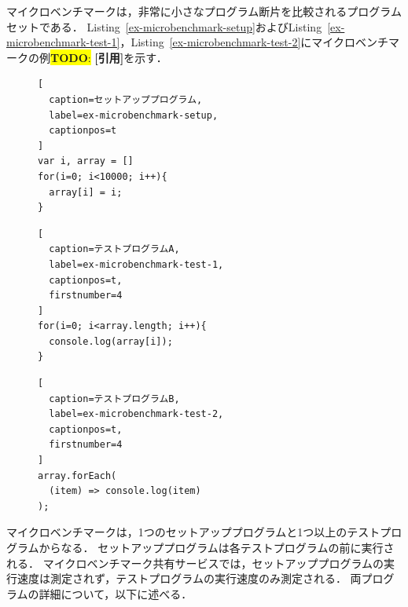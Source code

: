 \documentclass[11pt]{jreport}
\newcommand{\todo}[1]{\colorbox{yellow}{{\bf TODO}:}{\color{red} {\textbf{[#1]}}}}
\begin{document}
マイクロベンチマークは，非常に小さなプログラム断片を比較されるプログラムセットである．
Listing~\ref{ex-microbenchmark-setup}およびListing~\ref{ex-microbenchmark-test-1}，Listing~\ref{ex-microbenchmark-test-2}にマイクロベンチマークの例\todo{引用}を示す．

\begin{figure}[t]
\captionsetup{name=Listing}
\hspace{0.04\columnwidth}
\begin{minipage}[b]{0.96\linewidth}
\begin{lstlisting}[
  caption=セットアッププログラム,
  label=ex-microbenchmark-setup,
  captionpos=t
]
var i, array = []
for(i=0; i<10000; i++){
  array[i] = i;
}
\end{lstlisting}
\end{minipage}

\hspace{0.04\columnwidth}
\begin{minipage}[b]{0.445\linewidth}
\begin{lstlisting}[
  caption=テストプログラムA,
  label=ex-microbenchmark-test-1,
  captionpos=t,
  firstnumber=4
]
for(i=0; i<array.length; i++){
  console.log(array[i]);
}
\end{lstlisting}
\end{minipage}
\hspace{0.059\columnwidth}
\begin{minipage}[b]{0.445\linewidth}
\begin{lstlisting}[
  caption=テストプログラムB,
  label=ex-microbenchmark-test-2,
  captionpos=t,
  firstnumber=4
]
array.forEach(
  (item) => console.log(item)
);
\end{lstlisting}
\end{minipage}
\end{figure}


マイクロベンチマークは，1つのセットアッププログラムと1つ以上のテストプログラムからなる．
セットアッププログラムは各テストプログラムの前に実行される．
マイクロベンチマーク共有サービスでは，セットアッププログラムの実行速度は測定されず，テストプログラムの実行速度のみ測定される．
両プログラムの詳細について，以下に述べる．
\end{document}
